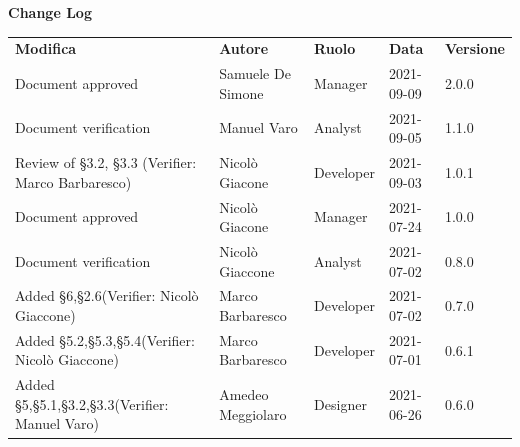 \documentclass[a4paper]{article}
\begin{document}
\begin{titlepage}
\begin{center}
    \end{center}
\end{titlepage}

\begin{center}
    \centering
    \textbf{\Large Change Log}\\
    \vspace{10px}
    \renewcommand{\arraystretch}{1.8}
    \label{tab:RequisitiFunzionali}
    \begin{longtable}[!h]{p{160px} p{90px} p{60px} p{60px} p{50px}}
        \rowcolor{logo!70} \textbf{Modifica}                                                   & \textbf{Autore}   & \textbf{Ruolo} & \textbf{Data} & \textbf{Versione} \\
        Document approved                                                                      & Samuele De Simone & Manager        & 2021-09-09    & 2.0.0             \\
        Document verification                                                                  & Manuel Varo       & Analyst        & 2021-09-05    & 1.1.0             \\
        Review of   \S{3.2}, \S{3.3}  \newline(Verifier: Marco Barbaresco)                     & Nicolò Giacone    & Developer      & 2021-09-03    & 1.0.1             \\
        Document approved                                                                      & Nicolò Giacone    & Manager        & 2021-07-24    & 1.0.0             \\
        Document verification                                                                  & Nicolò Giaccone   & Analyst        & 2021-07-02    & 0.8.0             \\
        Added \S{6},\S{2.6}\newline(Verifier: Nicolò Giaccone)                                 & Marco Barbaresco  & Developer      & 2021-07-02    & 0.7.0             \\
        Added \S{5.2},\S{5.3},\S{5.4}\newline(Verifier: Nicolò Giaccone)                       & Marco Barbaresco  & Developer      & 2021-07-01    & 0.6.1             \\
        Added \S{5},\S{5.1},\S{3.2},\S{3.3}\newline(Verifier: Manuel Varo)                     & Amedeo Meggiolaro & Designer       & 2021-06-26    & 0.6.0             \\

\end{longtable}
\end{center}
\end{document}
